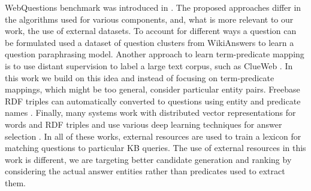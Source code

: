 WebQuestions benchmark was introduced in \cite{Berant:EMNLP13}.
The proposed approaches differ in the algorithms used for various components, and, what is more relevant to our work, the use of external datasets.
To account for different ways a question can be formulated \cite{berant2014semantic} used a dataset of question clusters from WikiAnswers to learn a question paraphrasing model.
Another approach to learn term-predicate mapping is to use distant supervision \cite{mintz2009distant} to label a large text corpus, such as ClueWeb \cite{yao2014information}.
In this work we build on this idea and instead of focusing on term-predicate mappings, which might be too general, consider particular entity pairs.
Freebase RDF triples can automatically converted to questions using entity and predicate names \cite{BordesCW14:emnlp}.
Finally, many systems work with distributed vector representations for words and RDF triples and use various deep learning techniques for answer selection \cite{BordesCW14:emnlp,yih2015semantic}.
In all of these works, external resources are used to train a lexicon for matching questions to particular KB queries.
The use of external resources in this work is different, we are targeting better candidate generation and ranking by considering the actual answer entities rather than predicates used to extract them.

